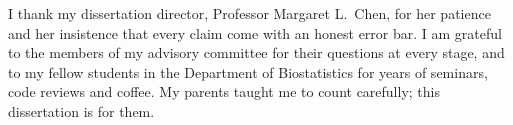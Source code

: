 I thank my dissertation director, Professor Margaret L.\ Chen, for her patience and her
insistence that every claim come with an honest error bar. I am grateful to the members of my
advisory committee for their questions at every stage, and to my fellow students in the
Department of Biostatistics for years of seminars, code reviews and coffee. My parents taught
me to count carefully; this dissertation is for them.

